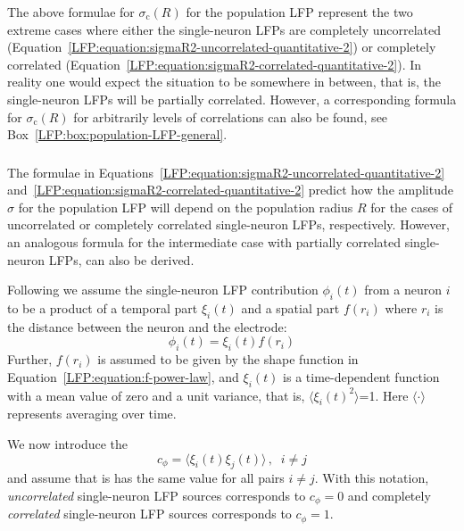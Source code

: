 The above formulae for $\sigma_\text{c}(R)$ for the population LFP represent the two extreme cases where either the single-neuron
LFPs are completely uncorrelated (Equation~\ref{LFP:equation:sigmaR2-uncorrelated-quantitative-2}) or completely correlated 
(Equation~\ref{LFP:equation:sigmaR2-correlated-quantitative-2}). In reality one would expect the situation to be somewhere in between, that is,
the single-neuron LFPs will be partially correlated. However, a corresponding formula for $\sigma_\text{c}(R)$ for arbitrarily levels of correlations can also be found, see Box~\ref{LFP:box:population-LFP-general}. 

 
\subsubsection{}
The formulae in Equations~\ref{LFP:equation:sigmaR2-uncorrelated-quantitative-2} 
and~\ref{LFP:equation:sigmaR2-correlated-quantitative-2} predict how the amplitude  $\sigma$ 
for the population LFP will depend on the population radius $R$ for the cases of uncorrelated or completely correlated
single-neuron LFPs, respectively. However, an analogous formula for the intermediate case with partially correlated single-neuron LFPs, can
also be derived.

Following \citet{Linden2011} we assume the single-neuron LFP contribution $\phi_i(t)$ from a neuron $i$ to be a product of a 
temporal part $\xi_i(t)$ and a spatial part $f(r_i)$ where $r_i$ is the distance between the neuron and the electrode:
\begin{equation}  
\phi_i(t)= \xi_i(t) f(r_i)
\label{LFP:box:equation:phii}
\end{equation}
Further, $f(r_i)$ is assumed to be given by the shape function in 
Equation~\ref{LFP:equation:f-power-law}, and $\xi_i(t)$ is a time-dependent function with a mean value of zero and a unit variance, that is,
$\langle \xi_i(t)^2 \rangle$=1. Here $\langle \cdot \rangle$ represents averaging over time.

We now introduce the  
\begin{equation}
c_\phi=\langle \xi_i(t) \xi_j(t)\rangle\, ,\;\; i \neq j
\label{LFP:box:equation:phii}
\end{equation}
and assume that is has the same value for all pairs $i \neq j$. With this notation,  
\emph{uncorrelated} single-neuron LFP sources corresponds to $c_\phi=0$ and 
completely \emph{correlated} single-neuron LFP sources corresponds to $c_\phi=1$.


